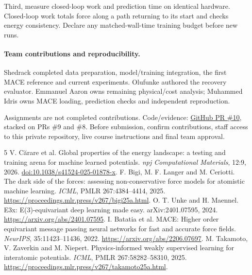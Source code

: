 \documentclass{article}
\begin{document}
Third, measure closed-loop work and prediction time on identical hardware. Closed-loop work totals force along a path returning to its start and checks energy consistency. Declare any matched-wall-time training budget before new runs.
\paragraph{Team contributions and reproducibility.}
Shedrack completed data preparation, model/training integration, the first MACE reference and current experiments. Olufunke authored the recovery evaluator. Emmanuel Aaron owns remaining physical/cost analysis; Muhammed Idris owns MACE loading, prediction checks and independent reproduction.

Assignments are not completed contributions. Code/evidence: \href{https://github.com/Shedrackeze002/idl-molecular-force-consistency/pull/10}{GitHub PR \#10}, stacked on PRs \#9 and \#8. Before submission, confirm contributions, staff access to this private repository, live course instructions and final team approval.
\begin{thebibliography}{5}\small
{} V. C\u{a}rare et al. Global properties of the energy landscape: a testing and training arena for machine learned potentials. \emph{npj Computational Materials}, 12:9, 2026. \href{https://doi.org/10.1038/s41524-025-01878-x}{doi:10.1038/s41524-025-01878-x}.
 F. Bigi, M. F. Langer and M. Ceriotti. The dark side of the forces: assessing non-conservative force models for atomistic machine learning. \emph{ICML}, PMLR 267:4384--4414, 2025. \url{https://proceedings.mlr.press/v267/bigi25a.html}.
 O. T. Unke and H. Maennel. E3x: E(3)-equivariant deep learning made easy. arXiv:2401.07595, 2024. \url{https://arxiv.org/abs/2401.07595}.
 I. Batatia et al. MACE: Higher order equivariant message passing neural networks for fast and accurate force fields. \emph{NeurIPS}, 35:11423--11436, 2022. \url{https://arxiv.org/abs/2206.07697}.
 M. Takamoto, V. Zaverkin and M. Niepert. Physics-informed weakly supervised learning for interatomic potentials. \emph{ICML}, PMLR 267:58282--58310, 2025. \url{https://proceedings.mlr.press/v267/takamoto25a.html}.
\end{thebibliography}
\end{document}
